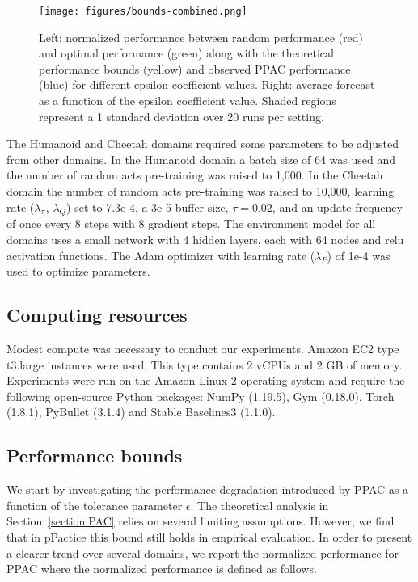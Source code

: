 \documentclass{article}
\begin{document}
            \begin{figure*}
                \texttt{[image: figures/bounds-combined.png]}
                \caption{Left: normalized performance between random performance (red) and optimal performance (green) along with the theoretical performance bounds (yellow) and observed PPAC performance (blue) for different epsilon coefficient values. Right: average forecast as a function of the epsilon coefficient value. Shaded regions represent a 1 standard deviation over 20 runs per setting.}
                \label{bounds}
            \end{figure*}

            The Humanoid and Cheetah domains required some parameters to be adjusted from other domains. In the Humanoid domain a batch size of 64 was used and the number of random acts pre-training was raised to 1,000. In the Cheetah domain the number of random acts pre-training was raised to 10,000, learning rate ($\lambda_\pi$, $\lambda_Q$) set to 7.3e-4, a 3e-5 buffer size, $\tau=0.02$, and an update frequency of once every 8 steps with 8 gradient steps.
            The environment model for all domains uses a small network with 4 hidden layers, each with 64 nodes and relu activation functions. The Adam optimizer with learning rate ($\lambda_P$) of 1e-4 was used to optimize parameters.



        \subsection{Computing resources}

            Modest compute was necessary to conduct our experiments. Amazon EC2 type t3.large instances were used. This type contains 2 vCPUs and 2 GB of memory. Experiments were run on the Amazon Linux 2 operating system and require the following open-source Python packages: NumPy (1.19.5), Gym (0.18.0), Torch (1.8.1), PyBullet (3.1.4) and Stable Baselines3 (1.1.0).

        \subsection{Performance bounds}

            We start by investigating the performance degradation introduced by PPAC as a function of the tolerance parameter $\epsilon$. The theoretical analysis in Section~\ref{section:PAC} relies on several limiting assumptions. However, we find that in pPactice this bound still holds in empirical evaluation. In order to present a clearer trend over several domains, we report the normalized performance for PPAC where the normalized performance is defined as follows.
\end{document}
